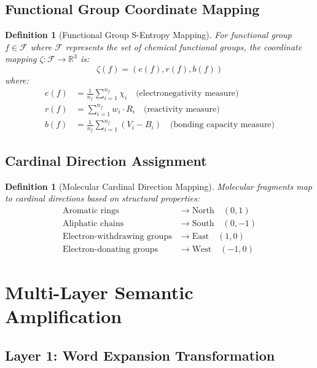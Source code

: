 \documentclass[12pt,a4paper]{article}
\newtheorem{definition}[theorem]{Definition}
\begin{document}
\subsection{Functional Group Coordinate Mapping}

\begin{definition}[Functional Group S-Entropy Mapping]
For functional group $f \in \mathcal{F}$ where $\mathcal{F}$ represents the set of chemical functional groups, the coordinate mapping $\zeta: \mathcal{F} \rightarrow \mathbb{R}^3$ is:
\begin{equation}
\zeta(f) = (e(f), r(f), b(f))
\end{equation}
where:
\begin{align}
e(f) &= \frac{1}{n_f} \sum_{i=1}^{n_f} \chi_i \quad \text{(electronegativity measure)} \\
r(f) &= \sum_{i=1}^{n_f} w_i \cdot R_i \quad \text{(reactivity measure)} \\
b(f) &= \frac{1}{n_f} \sum_{i=1}^{n_f} (V_i - B_i) \quad \text{(bonding capacity measure)}
\end{align}
\end{definition}

\subsection{Cardinal Direction Assignment}

\begin{definition}[Molecular Cardinal Direction Mapping]
Molecular fragments map to cardinal directions based on structural properties:
\begin{align}
\text{Aromatic rings} &\rightarrow \text{North} \quad (0, 1) \\
\text{Aliphatic chains} &\rightarrow \text{South} \quad (0, -1) \\
\text{Electron-withdrawing groups} &\rightarrow \text{East} \quad (1, 0) \\
\text{Electron-donating groups} &\rightarrow \text{West} \quad (-1, 0)
\end{align}
\end{definition}

\section{Multi-Layer Semantic Amplification}

\subsection{Layer 1: Word Expansion Transformation}
\end{document}
